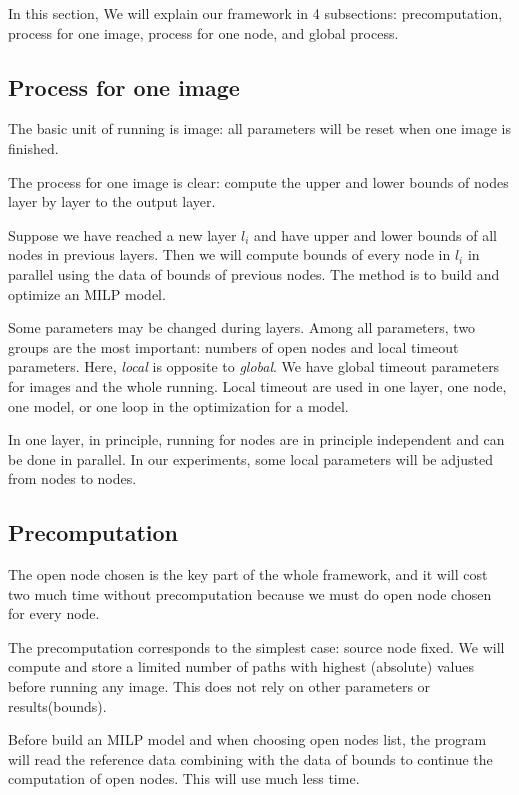 \documentclass{llncs}
\begin{document}

In this section, We will explain our framework in 4 subsections: precomputation, process for one image, process for one node, and global process.

\subsection{Process for one image}

The basic unit of running is image: all parameters will be reset when one image is finished.

The process for one image is clear: compute the upper and lower bounds of nodes layer by layer to the output layer. 

Suppose we have reached a new layer $l_i$ and have upper and lower bounds of all nodes in previous layers. Then we will compute bounds of every node in $l_i$ in parallel using the data of bounds of previous nodes. The method is to build and optimize an MILP model.

Some parameters may be changed during layers. Among all parameters, two groups are the most important: numbers of open nodes and local timeout parameters. Here, \emph{local} is opposite to \emph{global}. We have global timeout parameters for images and the whole running. Local timeout are used in one layer, one node, one model, or one loop in the optimization for a model.

In one layer, in principle, running for nodes are in principle independent and can be done in parallel. In our experiments, some local parameters will be adjusted from nodes to nodes.

\subsection{Precomputation}

The open node chosen is the key part of the whole framework, and it will cost two much time without precomputation because we must do open node chosen for every node. 

The precomputation corresponds to the simplest case: source node fixed. We will compute and store a limited number of paths with highest (absolute) values before running any image. This does not rely on other parameters or results(bounds).

Before build an MILP model and when choosing open nodes list,  the program will read the reference data combining with the data of bounds to continue the computation of open nodes. This will use much less time.
\end{document}
